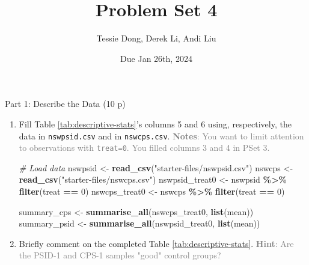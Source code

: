 \documentclass[
]{article}
\title{Problem Set 4}
\author{Tessie Dong, Derek Li, Andi Liu}
\date{Due Jan 26th, 2024}
\newenvironment{Shaded}{\begin{snugshade}}{\end{snugshade}}
\newcommand{\CommentTok}[1]{\textcolor[rgb]{0.56,0.35,0.01}{\textit{#1}}}
\newcommand{\DecValTok}[1]{\textcolor[rgb]{0.00,0.00,0.81}{#1}}
\newcommand{\FunctionTok}[1]{\textcolor[rgb]{0.13,0.29,0.53}{\textbf{#1}}}
\newcommand{\NormalTok}[1]{#1}
\newcommand{\OtherTok}[1]{\textcolor[rgb]{0.56,0.35,0.01}{#1}}
\newcommand{\SpecialCharTok}[1]{\textcolor[rgb]{0.81,0.36,0.00}{\textbf{#1}}}
\newcommand{\StringTok}[1]{\textcolor[rgb]{0.31,0.60,0.02}{#1}}
\begin{document}
\maketitle

\begin{center}
{\LARGE Part 1: Describe the Data (10 p)}
\end{center}

\begin{enumerate}
\def\labelenumi{\arabic{enumi}.}
\item
  Fill Table \ref{tab:descriptive-stats}'s columns 5 and 6 using,
  respectively, the data in \texttt{nswpsid.csv} and in
  \texttt{nswcps.csv}.
  \textcolor{Gray}{\textbf{Notes}: You want to limit attention to observations with \texttt{treat=0}. You filled columns 3 and 4 in PSet 3.}

\begin{Shaded}
\begin{Highlighting}[]
\CommentTok{\# Load data}
\NormalTok{nswpsid }\OtherTok{\textless{}{-}} \FunctionTok{read\_csv}\NormalTok{(}\StringTok{"starter{-}files/nswpsid.csv"}\NormalTok{)}
\NormalTok{nswcps }\OtherTok{\textless{}{-}} \FunctionTok{read\_csv}\NormalTok{(}\StringTok{"starter{-}files/nswcps.csv"}\NormalTok{)}
\NormalTok{nswpsid\_treat0 }\OtherTok{\textless{}{-}}\NormalTok{ nswpsid }\SpecialCharTok{\%\textgreater{}\%} \FunctionTok{filter}\NormalTok{(treat }\SpecialCharTok{==} \DecValTok{0}\NormalTok{)}
\NormalTok{nswcps\_treat0 }\OtherTok{\textless{}{-}}\NormalTok{ nswcps }\SpecialCharTok{\%\textgreater{}\%} \FunctionTok{filter}\NormalTok{(treat }\SpecialCharTok{==} \DecValTok{0}\NormalTok{)}
\end{Highlighting}
\end{Shaded}

\begin{Shaded}
\begin{Highlighting}[]
\NormalTok{summary\_cps }\OtherTok{\textless{}{-}} \FunctionTok{summarise\_all}\NormalTok{(nswcps\_treat0, }\FunctionTok{list}\NormalTok{(mean))}
\NormalTok{summary\_psid }\OtherTok{\textless{}{-}} \FunctionTok{summarise\_all}\NormalTok{(nswpsid\_treat0, }\FunctionTok{list}\NormalTok{(mean))}
\end{Highlighting}
\end{Shaded}

  
\item
  Briefly comment on the completed Table \ref{tab:descriptive-stats}.
  \textcolor{gray}{\textbf{Hint}: Are the PSID-1 and CPS-1 samples "good" control groups?}


\end{enumerate}
\end{document}
